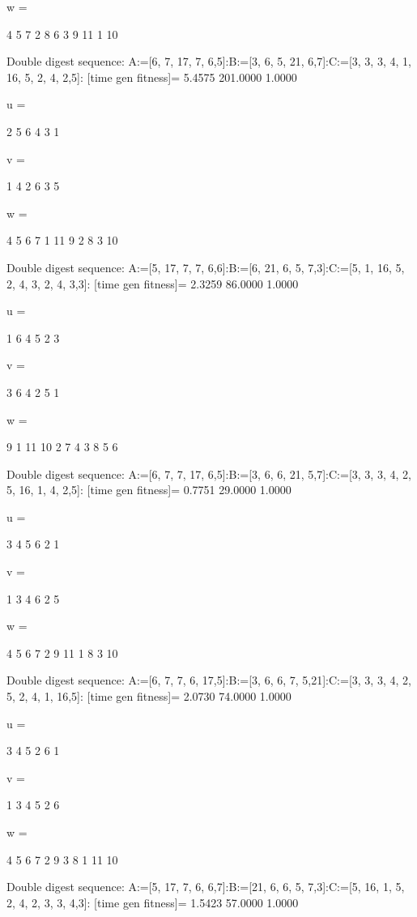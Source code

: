 w =

     4     5     7     2     8     6     3     9    11     1    10

Double digest sequence:
A:=[6, 7, 17, 7, 6,5]:B:=[3, 6, 5, 21, 6,7]:C:=[3, 3, 3, 4, 1, 16, 5, 2, 4, 2,5]:
[time gen fitness]=
    5.4575  201.0000    1.0000


u =

     2     5     6     4     3     1


v =

     1     4     2     6     3     5


w =

     4     5     6     7     1    11     9     2     8     3    10

Double digest sequence:
A:=[5, 17, 7, 7, 6,6]:B:=[6, 21, 6, 5, 7,3]:C:=[5, 1, 16, 5, 2, 4, 3, 2, 4, 3,3]:
[time gen fitness]=
    2.3259   86.0000    1.0000


u =

     1     6     4     5     2     3


v =

     3     6     4     2     5     1


w =

     9     1    11    10     2     7     4     3     8     5     6

Double digest sequence:
A:=[6, 7, 7, 17, 6,5]:B:=[3, 6, 6, 21, 5,7]:C:=[3, 3, 3, 4, 2, 5, 16, 1, 4, 2,5]:
[time gen fitness]=
    0.7751   29.0000    1.0000


u =

     3     4     5     6     2     1


v =

     1     3     4     6     2     5


w =

     4     5     6     7     2     9    11     1     8     3    10

Double digest sequence:
A:=[6, 7, 7, 6, 17,5]:B:=[3, 6, 6, 7, 5,21]:C:=[3, 3, 3, 4, 2, 5, 2, 4, 1, 16,5]:
[time gen fitness]=
    2.0730   74.0000    1.0000


u =

     3     4     5     2     6     1


v =

     1     3     4     5     2     6


w =

     4     5     6     7     2     9     3     8     1    11    10

Double digest sequence:
A:=[5, 17, 7, 6, 6,7]:B:=[21, 6, 6, 5, 7,3]:C:=[5, 16, 1, 5, 2, 4, 2, 3, 3, 4,3]:
[time gen fitness]=
    1.5423   57.0000    1.0000


